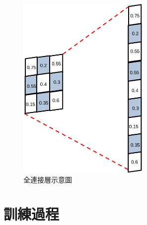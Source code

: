 \begin{figure}[H]
	\centering
	\includegraphics[height=9cm]{./pic/7oVj71cG.png}
	\caption{全連接層示意圖}
	\label{fig:FullyConnetedLayer}
\end{figure}

\section{訓練過程}

